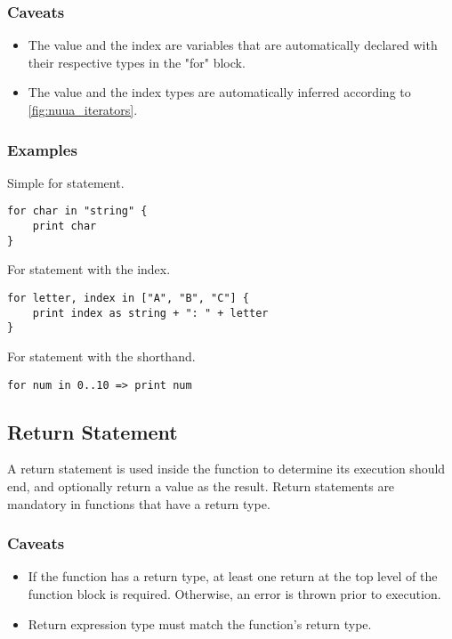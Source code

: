 \subsubsection{Caveats}

\begin{itemize}
    \item The value and the index are variables that are automatically declared with their respective types in the "for" block.
    \item The value and the index types are automatically inferred according to \autoref{fig:nuua_iterators}.
\end{itemize}
\clearpage
\subsubsection{Examples}

Simple for statement.
\begin{verbatim}
for char in "string" {
    print char
}
\end{verbatim}
For statement with the index.
\begin{verbatim}
for letter, index in ["A", "B", "C"] {
    print index as string + ": " + letter
}
\end{verbatim}
For statement with the shorthand.
\begin{verbatim}
for num in 0..10 => print num
\end{verbatim}

\subsection{Return Statement}

A return statement is used inside the function to determine its execution should end, and optionally return a value as the result.
Return statements are mandatory in functions that have a return type.

\subsubsection{Caveats}

\begin{itemize}
    \item If the function has a return type, at least one return at the top level of the function block is required. Otherwise, an error
        is thrown prior to execution.
    \item Return expression type must match the function's return type.
\end{itemize}

